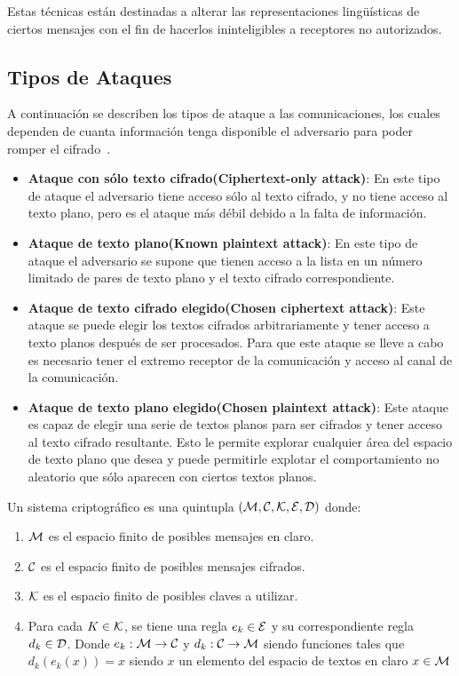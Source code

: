 Estas técnicas están destinadas a alterar las representaciones lingüísticas de ciertos mensajes con el fin de hacerlos ininteligibles a receptores no autorizados.


\subsection{Tipos de Ataques}
A continuaci\'on se describen   los  tipos de  ataque a  las comunicaciones, los cuales dependen  de 
cuanta  información  tenga  disponible  el  adversario  para  poder  romper  el  cifrado~\cite{at}.
\begin{itemize}
 \item \textbf{Ataque con sólo texto cifrado(Ciphertext-only  attack)}: En este tipo de ataque el adversario tiene acceso sólo al texto cifrado, y no tiene acceso al texto plano, pero es el ataque más débil debido a la falta de información.
 \item \textbf{Ataque de texto plano(Known plaintext attack)}: En este tipo de ataque el adversario se supone que tienen acceso a la lista en un número limitado de pares de texto plano y el texto cifrado correspondiente.
 \item \textbf{Ataque de texto cifrado elegido(Chosen ciphertext attack)}: Este ataque se puede elegir los textos cifrados arbitrariamente y tener acceso a texto planos después de ser procesados. Para que este ataque se lleve a cabo es necesario tener el extremo receptor de la comunicación y acceso al canal de la comunicación.
 \item \textbf{Ataque de texto plano elegido(Chosen plaintext attack)}: Este ataque es capaz de elegir una serie de textos planos para ser cifrados y tener acceso al texto cifrado resultante. Esto le permite explorar cualquier área del espacio de  texto plano que desea y puede permitirle explotar el comportamiento no aleatorio que sólo aparecen con ciertos textos planos.
\end{itemize}
\begin{definition}
Un sistema criptográfico es una quintupla $(\cal M,C,K,E,D)$ donde:

\begin{enumerate}
 \item $\cal M$ es el espacio finito de posibles mensajes en claro.
 \item $\cal C$ es el espacio finito de posibles mensajes cifrados.
 \item $\cal K$ es el espacio finito de posibles claves a utilizar.
 \item Para cada $K \in \cal K$, se tiene una regla $e_k\in \cal{E}$ y su correspondiente regla $d_k\in {\cal D}$. Donde $e_k :\cal M\rightarrow C$ y $d_k:\cal C\rightarrow M$ siendo funciones tales que $d_k(e_k(x))=x$ siendo $x$ un elemento del espacio de textos en claro $x\in\cal M$
\end{enumerate}
\end{definition}


